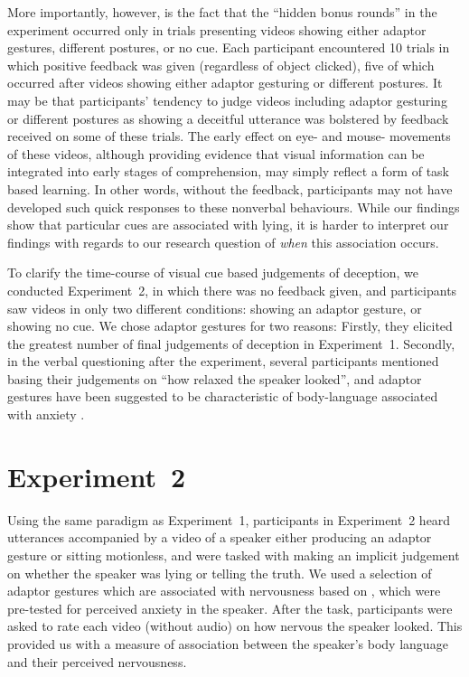 \documentclass[a4paper,man,natbib]{apa6}
\newcommand*{\spex}[1]{``{#1}''} %
\begin{document}
More importantly, however, is the fact that the ``hidden bonus rounds'' in the experiment occurred only in trials presenting videos showing either adaptor gestures, different postures, or no cue. 
Each participant encountered 10 trials in which positive feedback was given (regardless of object clicked), five of which occurred after videos showing either adaptor gesturing or different postures. 
It may be that participants' tendency to judge videos including adaptor gesturing or different postures as showing a deceitful utterance was bolstered by feedback received on some of these trials. 
The early effect on eye- and mouse- movements of these videos, although providing evidence that visual information can be integrated into early stages of comprehension, may simply reflect a form of task based learning.
In other words, without the feedback, participants may not have developed such quick responses to these nonverbal behaviours.
While our findings show that particular cues are associated with lying, it is harder to interpret our findings with regards to our research question of \textit{when} this association occurs.

To clarify the time-course of visual cue based judgements of deception, we conducted Experiment~2, in which there was no feedback given, and participants saw videos in only two different conditions: showing an adaptor gesture, or showing no cue. 
We chose adaptor gestures for two reasons: Firstly, they elicited the greatest number of final judgements of deception in Experiment~1. 
Secondly, in the verbal questioning after the experiment, several participants mentioned basing their judgements on \spex{how relaxed the speaker looked}, and adaptor gestures have been suggested to be characteristic of body-language associated with anxiety \citep[see][]{Gregersen2005}.

\section{Experiment~2}
Using the same paradigm as Experiment~1, participants in Experiment~2 heard utterances accompanied by a video of a speaker either producing an adaptor gesture or sitting motionless, and were tasked with making an implicit judgement on whether the speaker was lying or telling the truth. 
We used a selection of adaptor gestures which are associated with nervousness based on \citet{Gregersen2005}, which were pre-tested for perceived anxiety in the speaker.
After the task, participants were asked to rate each video (without audio) on how nervous the speaker looked.
This provided us with a measure of association between the speaker's body language and their perceived nervousness.
\end{document}
